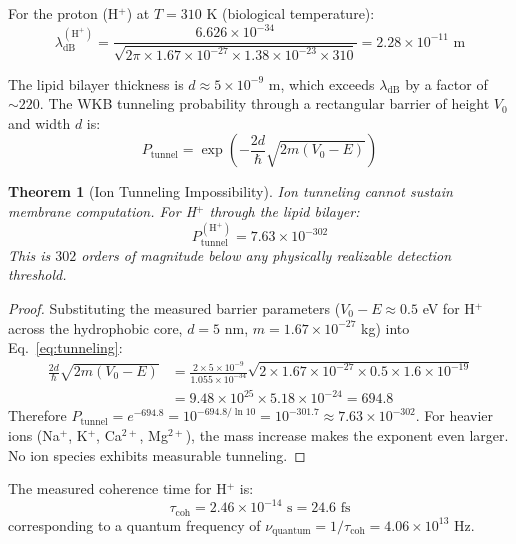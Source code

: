 \documentclass[12pt]{article}
\newtheorem{theorem}{Theorem}[section]
\theoremstyle{definition}
\theoremstyle{remark}
\begin{document}
For the proton (H$^+$) at $T = 310$ K (biological temperature):
\begin{equation}
\label{eq:proton_debroglie}
\lambda_{\mathrm{dB}}^{(\mathrm{H}^+)} = \frac{6.626 \times 10^{-34}}{\sqrt{2\pi \times 1.67 \times 10^{-27} \times 1.38 \times 10^{-23} \times 310}} = 2.28 \times 10^{-11} \text{ m}
\end{equation}

The lipid bilayer thickness is $d \approx 5 \times 10^{-9}$ m, which exceeds $\lambda_{\mathrm{dB}}$ by a factor of $\sim 220$. The WKB tunneling probability through a rectangular barrier of height $V_0$ and width $d$ is:
\begin{equation}
\label{eq:tunneling}
P_{\mathrm{tunnel}} = \exp\left(-\frac{2d}{\hbar}\sqrt{2m(V_0 - E)}\right)
\end{equation}

\begin{theorem}[Ion Tunneling Impossibility]
\label{thm:tunneling}
Ion tunneling cannot sustain membrane computation. For H$^+$ through the lipid bilayer:
\begin{equation}
\label{eq:tunneling_result}
P_{\mathrm{tunnel}}^{(\mathrm{H}^+)} = 7.63 \times 10^{-302}
\end{equation}
This is $302$ orders of magnitude below any physically realizable detection threshold.
\end{theorem}

\begin{proof}
Substituting the measured barrier parameters ($V_0 - E \approx 0.5$ eV for H$^+$ across the hydrophobic core, $d = 5$ nm, $m = 1.67 \times 10^{-27}$ kg) into Eq.~\eqref{eq:tunneling}:
\begin{align}
\frac{2d}{\hbar}\sqrt{2m(V_0 - E)} &= \frac{2 \times 5 \times 10^{-9}}{1.055 \times 10^{-34}} \sqrt{2 \times 1.67 \times 10^{-27} \times 0.5 \times 1.6 \times 10^{-19}} \nonumber \\
&= 9.48 \times 10^{25} \times 5.18 \times 10^{-24} = 694.8 \label{eq:tunneling_exponent}
\end{align}
Therefore $P_{\mathrm{tunnel}} = e^{-694.8} = 10^{-694.8/\ln 10} = 10^{-301.7} \approx 7.63 \times 10^{-302}$. For heavier ions (Na$^+$, K$^+$, Ca$^{2+}$, Mg$^{2+}$), the mass increase makes the exponent even larger. No ion species exhibits measurable tunneling. \qedhere
\end{proof}

The measured coherence time for H$^+$ is:
\begin{equation}
\label{eq:coherence_time}
\tau_{\mathrm{coh}} = 2.46 \times 10^{-14} \text{ s} = 24.6 \text{ fs}
\end{equation}
corresponding to a quantum frequency of $\nu_{\mathrm{quantum}} = 1/\tau_{\mathrm{coh}} = 4.06 \times 10^{13}$ Hz.
\end{document}
